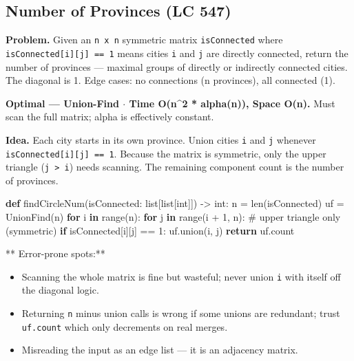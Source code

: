\documentclass[11pt]{article}
\providecommand{\tightlist}{\setlength{\itemsep}{1pt}\setlength{\parskip}{0pt}}
\newenvironment{Shaded}{\begin{snugshade}}{\end{snugshade}}
\newcommand{\BuiltInTok}[1]{\textcolor[rgb]{0.50,0.55,0.55}{#1}}
\newcommand{\CommentTok}[1]{\textcolor[rgb]{0.48,0.49,0.49}{#1}}
\newcommand{\ControlFlowTok}[1]{\textcolor[rgb]{0.99,0.74,0.29}{\textbf{#1}}}
\newcommand{\DecValTok}[1]{\textcolor[rgb]{0.96,0.45,0.00}{#1}}
\newcommand{\KeywordTok}[1]{\textcolor[rgb]{0.81,0.81,0.76}{\textbf{#1}}}
\newcommand{\NormalTok}[1]{\textcolor[rgb]{0.81,0.81,0.76}{#1}}
\newcommand{\OperatorTok}[1]{\textcolor[rgb]{0.81,0.81,0.76}{#1}}
\begin{document}
\subsection{Number of Provinces (LC 547)}\label{number-of-provinces-lc-547}

\textbf{Problem.} Given an \texttt{n\ x\ n} symmetric matrix \texttt{isConnected} where \texttt{isConnected{[}i{]}{[}j{]}\ ==\ 1} means cities \texttt{i} and \texttt{j} are directly connected, return the number of provinces --- maximal groups of directly or indirectly connected cities. The diagonal is 1. Edge cases: no connections (n provinces), all connected (1).

\textbf{Optimal --- Union-Find \(\cdot\) Time O(n\^{}2 * alpha(n)), Space O(n).} Must scan the full matrix; alpha is effectively constant.

\textbf{Idea.} Each city starts in its own province. Union cities \texttt{i} and \texttt{j} whenever \texttt{isConnected{[}i{]}{[}j{]}\ ==\ 1}. Because the matrix is symmetric, only the upper triangle (\texttt{j\ \textgreater{}\ i}) needs scanning. The remaining component count is the number of provinces.


\begin{Shaded}
\begin{Highlighting}[]
\KeywordTok{def}\NormalTok{ findCircleNum(isConnected: }\BuiltInTok{list}\NormalTok{[}\BuiltInTok{list}\NormalTok{[}\BuiltInTok{int}\NormalTok{]]) }\OperatorTok{{-}\textgreater{}} \BuiltInTok{int}\NormalTok{:}
\NormalTok{    n }\OperatorTok{=} \BuiltInTok{len}\NormalTok{(isConnected)}
\NormalTok{    uf }\OperatorTok{=}\NormalTok{ UnionFind(n)}
    \ControlFlowTok{for}\NormalTok{ i }\KeywordTok{in} \BuiltInTok{range}\NormalTok{(n):}
        \ControlFlowTok{for}\NormalTok{ j }\KeywordTok{in} \BuiltInTok{range}\NormalTok{(i }\OperatorTok{+} \DecValTok{1}\NormalTok{, n):   }\CommentTok{\# upper triangle only (symmetric)}
            \ControlFlowTok{if}\NormalTok{ isConnected[i][j] }\OperatorTok{==} \DecValTok{1}\NormalTok{:}
\NormalTok{                uf.union(i, j)}
    \ControlFlowTok{return}\NormalTok{ uf.count}
\end{Highlighting}
\end{Shaded}

** Error-prone spots:**

\begin{itemize}
\tightlist
\item
  Scanning the whole matrix is fine but wasteful; never union \texttt{i} with itself off the diagonal logic.
\item
  Returning \texttt{n} minus union calls is wrong if some unions are redundant; trust \texttt{uf.count} which only decrements on real merges.
\item
  Misreading the input as an edge list --- it is an adjacency matrix.
\end{itemize}
\end{document}
